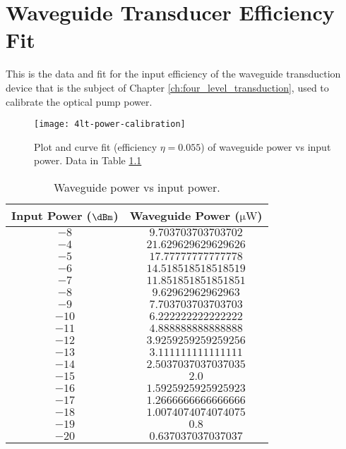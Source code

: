 \chapter{\label{ap:4lt_power_calibration}Waveguide Transducer Efficiency Fit}
This is the data and fit for the input efficiency of the waveguide transduction device that is the subject of Chapter \ref{ch:four_level_transduction}, used to calibrate the optical pump power.

\begin{figure}
\centering
\texttt{[image: 4lt-power-calibration]}
\caption{\label{fig:4lt_power_calibration} Plot and curve fit (efficiency $\eta=\num{0.055}$) of waveguide power vs input power. Data in Table \ref{tab:4lt_power_calibration}}
\end{figure}

\begin{table}
\centering
\begin{tabular}{c|c}
Input Power ($\unit{\dBm}$) & Waveguide Power ($\unit{\micro\watt}$)\\
\hline
$\num{-8}$ & $\num{9.703703703703702}$\\
$\num{-4}$ & $\num{21.629629629629626}$\\
$\num{-5}$ & $\num{17.77777777777778}$\\
$\num{-6}$ & $\num{14.518518518518519}$\\
$\num{-7}$ & $\num{11.851851851851851}$\\
$\num{-8}$ & $\num{9.62962962962963}$\\
$\num{-9}$ & $\num{7.703703703703703}$\\
$\num{-10}$ & $\num{6.222222222222222}$\\
$\num{-11}$ & $\num{4.888888888888888}$\\
$\num{-12}$ & $\num{3.9259259259259256}$\\
$\num{-13}$ & $\num{3.111111111111111}$\\
$\num{-14}$ & $\num{2.5037037037037035}$\\
$\num{-15}$ & $\num{2.0}$\\
$\num{-16}$ & $\num{1.5925925925925923}$\\
$\num{-17}$ & $\num{1.2666666666666666}$\\
$\num{-18}$ & $\num{1.0074074074074075}$\\
$\num{-19}$ & $\num{0.8}$\\
$\num{-20}$ & $\num{0.637037037037037}$\\
\end{tabular}
\caption{\label{tab:4lt_power_calibration} Waveguide power vs input power.}
\end{table}
